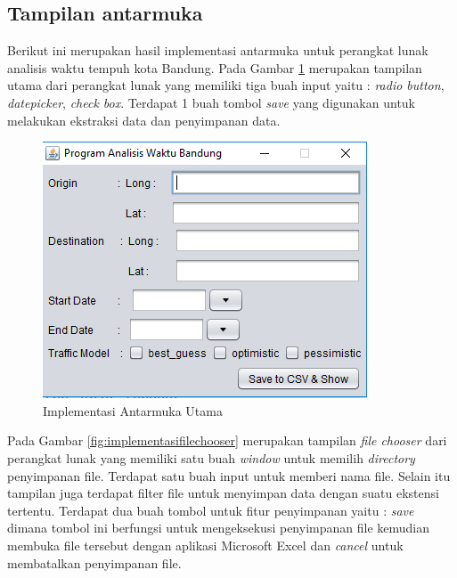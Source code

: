 \subsection{Tampilan antarmuka}
\label{subsec:tampilanantarmuka}

Berikut ini merupakan hasil implementasi antarmuka untuk perangkat lunak analisis waktu tempuh kota Bandung. Pada Gambar \ref{fig:implementasiantarmukautama} merupakan tampilan utama dari perangkat lunak yang memiliki tiga buah input yaitu : \textit{radio button}, \textit{datepicker}, \textit{check box}. Terdapat 1 buah tombol \textit{save} yang digunakan untuk melakukan ekstraksi data dan penyimpanan data.

\begin{figure}[H]
				\centering		
				\includegraphics[scale=0.7]{Gambar/gui1.png}
				\caption[Implementasi Antarmuka Utama]{Implementasi Antarmuka Utama}
				\label{fig:implementasiantarmukautama}	
			\end{figure}
			
Pada Gambar \ref{fig:implementasifilechooser} merupakan tampilan \textit{file chooser} dari perangkat lunak yang memiliki satu buah \textit{window} untuk memilih \textit{directory} penyimpanan file. Terdapat satu buah input untuk memberi nama file. Selain itu tampilan juga terdapat filter file untuk menyimpan data dengan suatu ekstensi tertentu. Terdapat dua buah tombol untuk fitur penyimpanan yaitu : \textit{save} dimana tombol ini berfungsi untuk mengeksekusi penyimpanan file kemudian membuka file tersebut dengan aplikasi Microsoft Excel dan \textit{cancel} untuk membatalkan penyimpanan file.

